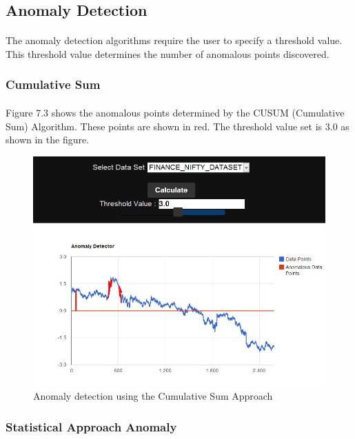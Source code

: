 \documentclass[12pt,a4paper]{report}
\begin{document}
\subsection{Anomaly Detection}
\paragraph{} The anomaly detection algorithms require the user to specify a threshold value. This threshold value  determines the number of anomalous points discovered.
\subsubsection{Cumulative Sum}
\paragraph{} Figure 7.3 shows the anomalous points determined by the CUSUM (Cumulative Sum) Algorithm. These points are shown in red. The threshold value set is 3.0 as shown in the figure.
\begin{figure}[h!]

  \centering
    \includegraphics[scale=0.5]{./screenshots/result_ano_cusum.png}
  \caption{Anomaly detection using the Cumulative Sum Approach}
\end{figure}

\subsubsection{Statistical Approach Anomaly}
\end{document}
